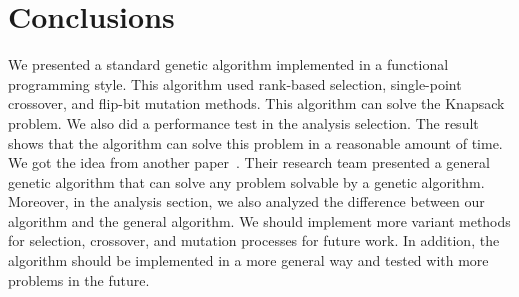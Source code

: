 \documentclass[sigconf]{acmart}
\begin{document}
\section{Conclusions}
\label{conclusions}

We presented a standard genetic algorithm implemented in a functional programming style. This algorithm used rank-based selection, single-point crossover, and flip-bit mutation methods. This algorithm can solve the Knapsack problem. We also did a performance test in the analysis selection. The result shows that the algorithm can solve this problem in a reasonable amount of time. We got the idea from another paper~\cite{choosenPaper}. Their research team presented a general genetic algorithm that can solve any problem solvable by a genetic algorithm. Moreover, in the analysis section, we also analyzed the difference between our algorithm and the general algorithm. We should implement more variant methods for selection, crossover, and mutation processes for future work. In addition, the algorithm should be implemented in a more general way and tested with more problems in the future. 



\balance

 
\end{document}
